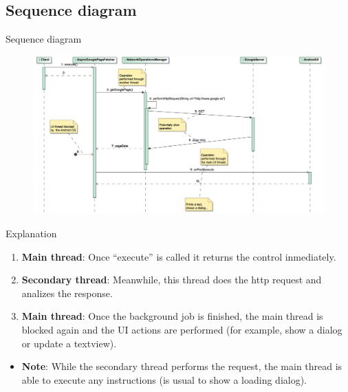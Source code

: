 \documentclass{beamer}
\begin{document}
\subsection{Sequence diagram}
\begin{frame}{Sequence diagram}
\begin{figure}
\begin{center}
\includegraphics[scale=0.4]{../naive/design_models/get_google_data_sequence}
\end{center}
\end{figure}
\end{frame}

\begin{frame}{Explanation}
\begin{enumerate}
\item {\bf Main thread}: Once ``execute'' is called it returns the control inmediately.
\item {\bf Secondary thread}: Meanwhile, this thread does the http request and analizes the response.
\item {\bf Main thread}: Once the background job is finished, the main thread is blocked again and the UI actions are performed (for example, show a dialog or update a textview).
\end{enumerate}
\begin{itemize}
\item {\bf Note}: While the secondary thread performs the request, the main thread is able to execute any instructions (is usual to show a loading dialog).
\end{itemize}
\end{frame}
\end{document}
